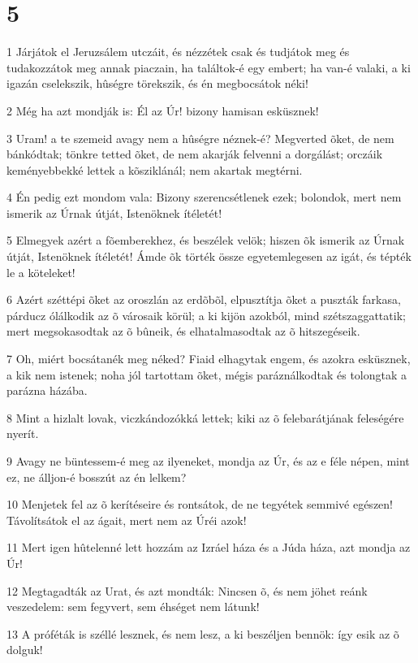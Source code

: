 \chapter{5}

\par 1 Járjátok el Jeruzsálem utczáit, és nézzétek csak és tudjátok meg és tudakozzátok meg annak piaczain, ha találtok-é egy embert; ha van-é valaki, a ki igazán cselekszik, hûségre törekszik, és én megbocsátok néki!
\par 2 Még ha azt mondják is: Él az Úr! bizony hamisan esküsznek!
\par 3 Uram! a te szemeid avagy nem a hûségre néznek-é? Megverted õket, de nem bánkódtak; tönkre tetted õket, de nem akarják felvenni a dorgálást; orczáik keményebbekké lettek a kõsziklánál; nem akartak megtérni.
\par 4 Én pedig ezt mondom vala: Bizony szerencsétlenek ezek; bolondok, mert nem ismerik az Úrnak útját, Istenöknek ítéletét!
\par 5 Elmegyek azért a fõemberekhez, és beszélek velök; hiszen õk ismerik az Úrnak útját, Istenöknek ítéletét! Ámde õk törték össze egyetemlegesen az igát, és tépték le a köteleket!
\par 6 Azért széttépi õket az oroszlán az erdõbõl, elpusztítja õket a puszták farkasa, párducz ólálkodik az õ városaik körül; a ki kijön azokból, mind szétszaggattatik; mert megsokasodtak az õ bûneik, és elhatalmasodtak az õ hitszegéseik.
\par 7 Oh, miért bocsátanék meg néked? Fiaid elhagytak engem, és azokra esküsznek, a kik nem istenek; noha jól tartottam õket, mégis paráználkodtak és tolongtak a parázna házába.
\par 8 Mint a hizlalt lovak, viczkándozókká lettek; kiki az õ felebarátjának feleségére nyerít.
\par 9 Avagy ne büntessem-é meg az ilyeneket, mondja az Úr, és az e féle népen, mint ez, ne álljon-é bosszút az én lelkem?
\par 10 Menjetek fel az õ kerítéseire és rontsátok, de ne tegyétek semmivé egészen! Távolítsátok el az ágait, mert nem az  Úréi azok!
\par 11 Mert igen hûtelenné lett hozzám az Izráel háza és a Júda háza, azt mondja az Úr!
\par 12 Megtagadták az Urat, és azt mondták: Nincsen õ, és nem jöhet reánk veszedelem: sem fegyvert, sem éhséget nem látunk!
\par 13 A próféták is széllé lesznek, és nem lesz, a ki beszéljen bennök: így esik az õ dolguk!
